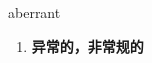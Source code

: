 
\begin{frame}
{\huge aberrant}
\begin{center}
\begin{enumerate}\Large
  \item \textbf{异常的，非常规的}
\end{enumerate}
\end{center}
\end{frame}
